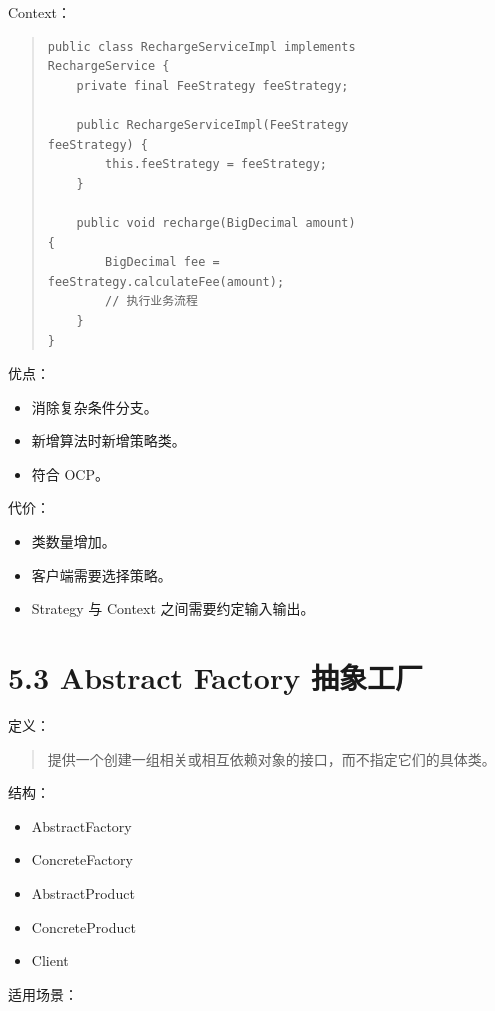 \documentclass[UTF8,zihao=-4]{ctexart}
\begin{document}
Context：

\begin{quote}
\footnotesize
\begin{verbatim}
public class RechargeServiceImpl implements 
RechargeService {
    private final FeeStrategy feeStrategy;

    public RechargeServiceImpl(FeeStrategy 
feeStrategy) {
        this.feeStrategy = feeStrategy;
    }

    public void recharge(BigDecimal amount) 
{
        BigDecimal fee = 
feeStrategy.calculateFee(amount);
        // 执行业务流程
    }
}
\end{verbatim}
\end{quote}

优点：

\begin{itemize}
\item 消除复杂条件分支。
\item 新增算法时新增策略类。
\item 符合 OCP。
\end{itemize}

代价：

\begin{itemize}
\item 类数量增加。
\item 客户端需要选择策略。
\item Strategy 与 Context 之间需要约定输入输出。
\end{itemize}

\section{5.3 Abstract Factory 抽象工厂}

定义：

\begin{quote}
提供一个创建一组相关或相互依赖对象的接口，而不指定它们的具体类。
\end{quote}

结构：

\begin{itemize}
\item AbstractFactory
\item ConcreteFactory
\item AbstractProduct
\item ConcreteProduct
\item Client
\end{itemize}

适用场景：
\end{document}
